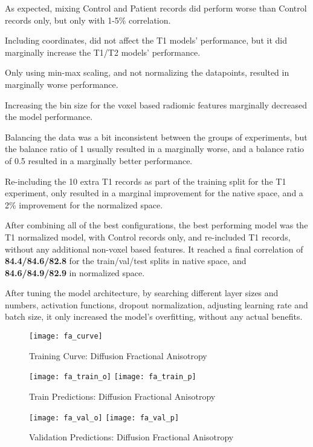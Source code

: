 As expected, mixing Control and Patient records did perform worse than Control records only, but only with 1-5\% correlation.\par
Including coordinates, did not affect the T1 models' performance, but it did marginally increase the T1/T2 models' performance.\par
Only using min-max scaling, and not normalizing the datapoints, resulted in marginally worse performance.\par
Increasing the bin size for the voxel based radiomic features marginally decreased the model performance.\par
Balancing the data was a bit inconsistent between the groups of experiments, but the balance ratio of 1 usually resulted in a marginally worse, and a balance ratio of 0.5 resulted in a marginally better performance.\par
Re-including the 10 extra T1 records as part of the training split for the T1 experiment, only resulted in a marginal improvement for the native space, and a 2\% improvement for the normalized space.\par
After combining all of the best configurations, the best performing model was the T1 normalized model, with Control records only, and re-included T1 records, without any additional non-voxel based features. It reached a final correlation of \textbf{84.4/84.6/82.8} for the train/val/test splits in native space, and \textbf{84.6/84.9/82.9} in normalized space.\par
After tuning the model architecture, by searching different layer sizes and numbers, activation functions, dropout normalization, adjusting learning rate and batch size, it only increased the model's overfitting, without any actual benefits.

\begin{figure}[H]
\centering
\texttt{[image: fa\_curve]}
\caption{Training Curve: Diffusion Fractional Anisotropy}
\label{fig:curve-fa}
\end{figure}

\begin{figure}[H]
\centering
\texttt{[image: fa\_train\_o]}
\texttt{[image: fa\_train\_p]}
\caption{Train Predictions: Diffusion Fractional Anisotropy}
\label{fig:pred-tra-fa}
\end{figure}

\begin{figure}[H]
\centering
\texttt{[image: fa\_val\_o]}
\texttt{[image: fa\_val\_p]}
\caption{Validation Predictions: Diffusion Fractional Anisotropy}
\label{fig:pred-val-fa}
\end{figure}

